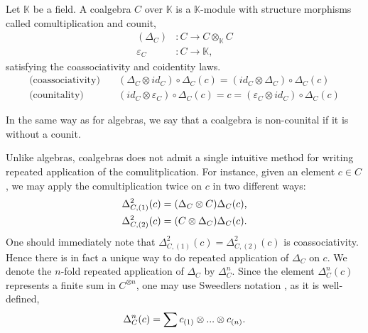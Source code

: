 \documentclass[../thesis.tex]{subfiles}
\begin{document}
            \begin{definition}
                Let $\mathbb{K}$ be a field. A coalgebra $C$ over $\mathbb{K}$ is a $\mathbb{K}$-module with structure morphisms called comultiplication and counit,
                \begin{align*}
                    (\Delta_C) & : C \rightarrow C\otimes_{\mathbb{K}}C \\
                    \varepsilon_C & : C \rightarrow \mathbb{K},
                \end{align*}
                satisfying the coassociativity and coidentity laws. 
                \begin{align*}
                    \text{(coassociativity)} \quad & (\Delta_C\otimes id_C)\circ\Delta_C(c) = (id_C\otimes\Delta_C)\circ\Delta_C(c) \\
                    \text{(counitality)} \quad & (id_C\otimes\varepsilon_C)\circ\Delta_C(c) = c = (\varepsilon_C\otimes id_C)\circ\Delta_C(c)
                \end{align*}
            \end{definition}

            In the same way as for algebras, we say that a coalgebra is non-counital if it is without a counit.

            Unlike algebras, coalgebras does not admit a single intuitive method for writing repeated application of the comulitplication. For instance, given an element $c\in C$, we may apply the comultiplication twice on $c$ in two different ways:
            \begin{align*}
                \Delta_{C,(1)}^2(c) & = (\Delta_C \otimes C)\Delta_C(c)\tt{,} \\
                \Delta_{C,(2)}^2(c) & = (C \otimes \Delta_C)\Delta_C(c)\tt{.}
            \end{align*}
            One should immediately note that $\Delta_{C,(1)}^2(c) = \Delta_{C,(2)}^2(c)$ is coassociativity. Hence there is in fact a unique way to do repeated application of $\Delta_C$ on $c$. We denote the $n$-fold repeated application of $\Delta_C$ by $\Delta_C^n$. Since the element $\Delta_C^n(c)$ represents a finite sum in $C^{\otimes n}$, one may use Sweedlers notation \cite{Loday12}, as it is well-defined,
            \begin{align*}
                \Delta_C^n(c) = \sum c_{(1)}\otimes ... \otimes c_{(n)}\tt{.}
            \end{align*}
            
\end{document}
